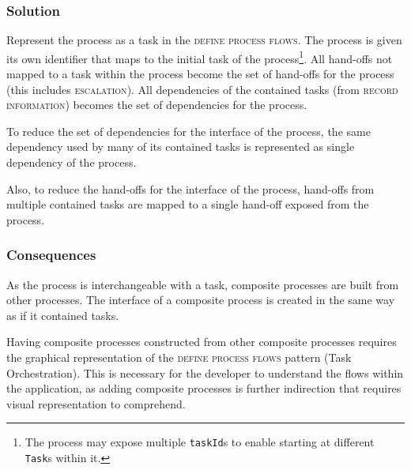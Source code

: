 \documentclass[prodmode]{style/acmlarge}
\begin{document}
\subsubsection*{\textbf{Solution}} Represent the process as a task in the
\textsc{define process flows}.  The process is given its own identifier that
maps to the initial task of the process\footnote{The process may expose multiple
\texttt{taskId}s to enable starting at different \texttt{Task}s within it.}.
All hand-offs not mapped to a task within the process become the set of
hand-offs for the process (this includes \textsc{escalation}).  All dependencies
of the contained tasks (from \textsc{record information}) becomes the set of
dependencies for the process.

To reduce the set of dependencies for the interface of the process, the same
dependency used by many of its contained tasks is represented as single
dependency of the process.

Also, to reduce the hand-offs for the interface of the process, hand-offs from
multiple contained tasks are mapped to a single hand-off exposed from the
process.

\subsubsection*{Consequences} As the process is interchangeable with a task,
composite processes are built from other processes.  The interface of a
composite process is created in the same way as if it contained tasks.

Having composite processes constructed from other composite processes requires
the graphical representation of the \textsc{define process flows} pattern (Task
Orchestration).  This is necessary for the developer to understand the flows
within the application, as adding composite processes is further indirection
that requires visual representation to comprehend.
\end{document}
